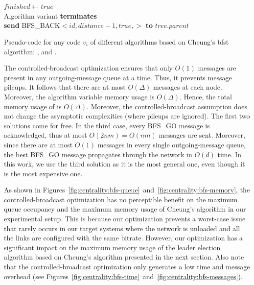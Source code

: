 {{\\

 {
	\\
	 {
		$finished \gets true$\;
		\\
		Algorithm variant {\bf terminates}\label{alg:centrality:bfs:line:term2}\;
	}{
	\\
	{\bf send} BFS\_BACK${<}id, distance - 1, true,$${>}$ {\bf to} $tree.parent$\label{alg:centrality:bfs:line:back4}\;
}
}
}
\caption{Pseudo-code for any code $v_i$ of different algorithms based on Cheung's \gls{bfst} algorithm: \cheungCb{}, \cheungIeCb{} and \cheungCbAgg{}.\label{alg:centrality:bfs}\vspace{1em}}
}

The controlled-broadcast optimization ensures that only $O(1)$ messages are present in any outgoing-message queue at a time. Thus, it prevents message pileups. It follows that there are at most $O(\Delta)$ messages at each node. Moreover, the algorithm variable memory usage is $O(\Delta)$. Hence, the total memory usage of \cheungCb{} is $O(\Delta)$. Moreover, the controlled-broadcast assumption does not change the asymptotic complexities (where pileups are ignored). The first two solutions come for free. In the third case, every BFS\_GO message is acknowledged, thus at most $O(2nm) = O(nm)$  messages are sent. Moreover, since there are at most $O(1)$ messages in every single outgoing-message queue, the best BFS\_GO message propagates through the network in $O(d)$ time. In this work, we use the third solution as it is the most general one, even though it is the most expensive one.

As shown in Figures~\ref{fig:centrality:bfs-queue}~and~\ref{fig:centrality:bfs-memory}, the controlled-broadcast optimization has no perceptible benefit on the maximum queue occupancy and the maximum memory usage of Cheung's algorithm in our experimental setup. This is because our optimization prevents a worst-case issue that rarely occurs in our target systems where the network is unloaded and all the links are configured with the same bitrate. However, our optimization has a significant impact on the maximum memory usage of the leader election algorithm based on Cheung's algorithm presented in the next section. Also note that the controlled-broadcast optimization only generates a low time and message overhead (see Figures~\ref{fig:centrality:bfs-time}~and~\ref{fig:centrality:bfs-messages}).

